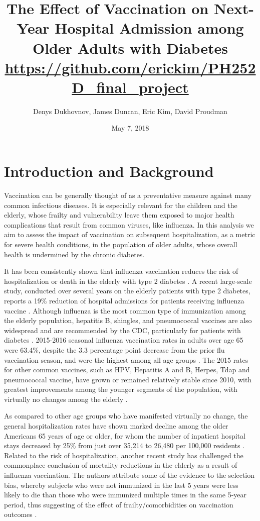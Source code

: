 \documentclass[english, 12pt]{article}
\title{The Effect of Vaccination on Next-Year Hospital Admission among Older Adults with Diabetes \\
\small \url{https://github.com/erickim/PH252D\_final\_project}}
\author{Denys Dukhovnov, James Duncan, Eric Kim, David Proudman}
\date{May 7, 2018}
\begin{document}
\maketitle

\newpage

\section{Introduction and Background}
Vaccination can be generally thought of as a preventative measure against many common infectious diseases. It is especially relevant for the children and the elderly, whose frailty and vulnerability leave them exposed to major health complications that result from common viruses, like influenza. In this analysis we aim to assess the impact of vaccination on subsequent hospitalization, as a metric for severe health conditions, in the population of older adults, whose overall health is undermined by the chronic diabetes.

It has been consistently shown that influenza vaccination reduces the risk of hospitalization or death in the elderly with type 2 diabetes \cite{Looijmans}. A recent large-scale study, conducted over several years on the elderly patients with type 2 diabetes, reports a 19\% reduction of hospital admissions for patients receiving influenza vaccine \cite{Vamos}. Although influenza is the most common type of immunization among the elderly population, hepatitis B, shingles, and pneumococcal vaccines are also widespread and are recommended by the CDC, particularly for patients with diabetes \cite{CDC1}. 2015-2016 seasonal influenza vaccination rates in adults over age 65 were 63.4\%, despite the 3.3 percentage point decrease from the prior flu vaccination season, and were the highest among all age groups \cite{CDC2}. The 2015 rates for other common vaccines, such as HPV, Hepatitis A and B, Herpes, Tdap and pneumococcal vaccine, have grown or remained relatively stable since 2010, with greatest improvements among the younger segments of the population, with virtually no changes among the elderly \cite{Williams}.

As compared to other age groups who have manifested virtually no change, the general hospitalization rates have shown marked decline among the older Americans 65 years of age or older, for whom the number of inpatient hospital stays decreased by 25\% from just over 35,214 to 26,480 per 100,000 residents \cite{Sun}. Related to the risk of hospitalization, another recent study has challenged the commonplace conclusion of mortality reductions in the elderly as a result of influenza vaccination. The authors attribute some of the evidence to the selection bias, whereby subjects who were not immunized in the last 5 years were less likely to die than those who were immunized multiple times in the same 5-year period, thus suggesting of the effect of frailty/comorbidities on vaccination outcomes \cite{Baxter}.
\end{document}
